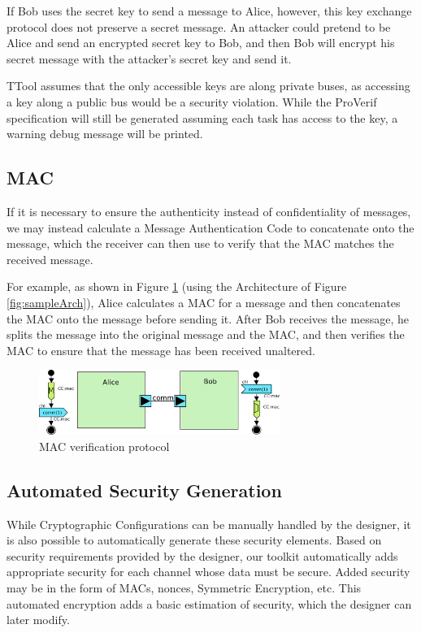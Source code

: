 \documentclass{llncs}
\begin{document}
If Bob uses the secret key to send a message to Alice, however, this key exchange protocol does not preserve a secret
message. An attacker could pretend to be Alice and send an encrypted secret key to Bob, and then Bob will encrypt his
secret message with the attacker's secret key and send it.


TTool assumes that the only accessible keys are along private buses, as accessing a key along a public bus would be a security violation. While the ProVerif specification will still be generated assuming each task has access to the key, a warning debug message will be printed. 

\subsection{MAC}

If it is necessary to ensure the authenticity instead of confidentiality of messages, we may instead calculate a Message Authentication Code to concatenate onto the message, which the receiver can then use to verify that the MAC matches the received message.

For example, as shown in Figure \ref{fig:macComp} (using the Architecture of Figure \ref{fig:sampleArch}), Alice calculates a MAC for a message and then concatenates the MAC onto the message before sending it. After Bob receives the message, he splits the message into the original message and the MAC, and then verifies the MAC to ensure that the message has been received unaltered.

\begin{figure}[htbp]
	\centering
 	\includegraphics[width=0.7\textwidth]{figures/securityStuff/macComp.pdf}
	\caption{MAC verification protocol}
	\label{fig:macComp}
\end{figure}

\subsection{Automated Security Generation}

While Cryptographic Configurations can be manually handled by the designer,
it is also possible to automatically generate these security elements. Based on security requirements provided by the designer, our toolkit automatically adds appropriate security for each channel whose data must be secure. Added security may be in the form of MACs, nonces, Symmetric Encryption, etc. This automated encryption adds a basic estimation of security, which the designer can later modify.
\end{document}
